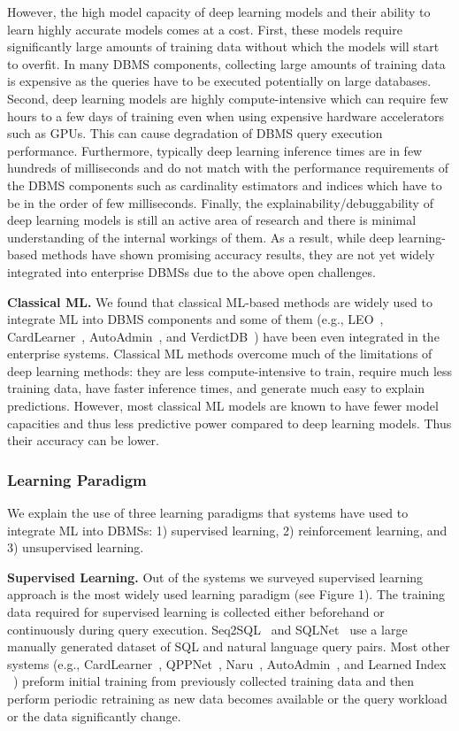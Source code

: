 However, the high model capacity of deep learning models and their ability to learn highly accurate models comes at a cost.
First, these models require significantly large amounts of training data without which the models will start to overfit. In many DBMS components, collecting large amounts of training data is expensive as the queries have to be executed potentially on large databases.
Second, deep learning models are highly compute-intensive which can require few hours to a few days of training even when using expensive hardware accelerators such as GPUs. This can cause degradation of DBMS query execution performance.
Furthermore, typically deep learning inference times are in few hundreds of milliseconds and do not match with the performance requirements of the DBMS components such as cardinality estimators and indices which have to be in the order of few milliseconds.
Finally, the explainability/debuggability of deep learning models is still an active area of research and there is minimal understanding of the internal workings of them.
As a result, while deep learning-based methods have shown promising accuracy results, they are not yet widely integrated into enterprise DBMSs due to the above open challenges.


\vspace{2mm}
\noindent \textbf{Classical ML.} We found that classical ML-based methods are widely used to integrate ML into DBMS components and some of them (e.g., LEO~\cite{leo}, CardLearner~\cite{cardlearner}, AutoAdmin~\cite{autoadmin}, and VerdictDB~\cite{verdict}) have been even integrated in the enterprise systems.
Classical ML methods overcome much of the limitations of deep learning methods: they are less compute-intensive to train, require much less training data, have faster inference times, and generate much easy to explain predictions.
However, most classical ML models are known to have fewer model capacities and thus less predictive power compared to deep learning models. Thus their accuracy can be lower.


\subsubsection{Learning Paradigm}
We explain the use of three learning paradigms that systems have used to integrate ML into DBMSs: 1) supervised learning, 2) reinforcement learning, and 3) unsupervised learning.

\vspace{2mm}
\noindent \textbf{Supervised Learning.} Out of the systems we surveyed supervised learning approach is the most widely used learning paradigm (see Figure 1).
The training data required for supervised learning is collected either beforehand or continuously during query execution.
Seq2SQL~\cite{seq2sql} and SQLNet~\cite{sqlnet} use a large manually generated dataset of SQL and natural language query pairs.
Most other systems (e.g., CardLearner~\cite{cardlearner}, QPPNet~\cite{qppnet}, Naru~\cite{naru}, AutoAdmin~\cite{autoadmin, autoadmin_2}, and Learned Index ~\cite{learnedindex}) preform initial training from previously collected training data and then perform periodic retraining as new data becomes available or the query workload or the data significantly change.

